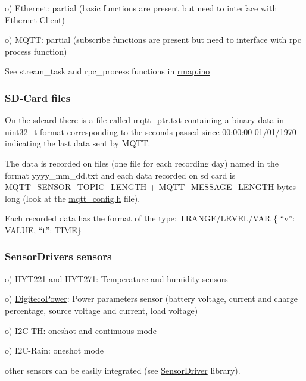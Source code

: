 o) Ethernet\+: partial (basic functions are present but need to interface with Ethernet Client)

o) M\+Q\+TT\+: partial (subscribe functions are present but need to interface with rpc process function)

See stream\+\_\+task and rpc\+\_\+process functions in \hyperlink{rmap_8ino}{rmap.\+ino}\hypertarget{index_files}{}\subsubsection{S\+D-\/\+Card files}\label{index_files}
On the sdcard there is a file called mqtt\+\_\+ptr.\+txt containing a binary data in uint32\+\_\+t format corresponding to the seconds passed since 00\+:00\+:00 01/01/1970 indicating the last data sent by M\+Q\+TT.

The data is recorded on files (one file for each recording day) named in the format yyyy\+\_\+mm\+\_\+dd.\+txt and each data recorded on sd card is M\+Q\+T\+T\+\_\+\+S\+E\+N\+S\+O\+R\+\_\+\+T\+O\+P\+I\+C\+\_\+\+L\+E\+N\+G\+TH + M\+Q\+T\+T\+\_\+\+M\+E\+S\+S\+A\+G\+E\+\_\+\+L\+E\+N\+G\+TH bytes long (look at the \hyperlink{mqtt__config_8h}{mqtt\+\_\+config.\+h} file).

Each recorded data has the format of the type\+: T\+R\+A\+N\+G\+E/\+L\+E\+V\+E\+L/\+V\+AR \{ “v”\+: V\+A\+L\+UE, “t”\+: T\+I\+ME\}\hypertarget{index_sensordriversensors}{}\subsubsection{Sensor\+Driver\textquotesingle{}s sensors}\label{index_sensordriversensors}
o) H\+Y\+T221 and H\+Y\+T271\+: Temperature and humidity sensors

o) \hyperlink{namespaceDigitecoPower}{Digiteco\+Power}\+: Power parameters sensor (battery voltage, current and charge percentage, source voltage and current, load voltage)

o) I2\+C-\/\+TH\+: oneshot and continuous mode

o) I2\+C-\/\+Rain\+: oneshot mode

other sensors can be easily integrated (see \hyperlink{classSensorDriver}{Sensor\+Driver} library). 
